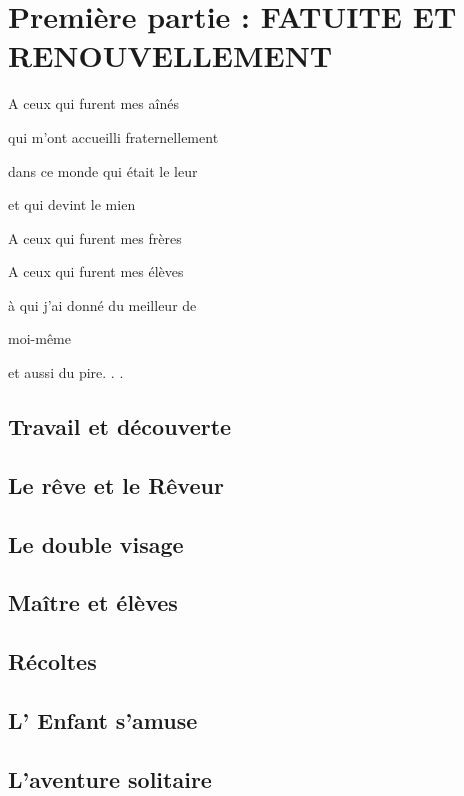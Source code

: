 \part{Première partie : FATUITE ET RENOUVELLEMENT}

\newpage

\begin{center}
    A ceux qui furent mes aînés
    
    qui m’ont accueilli fraternellement  
    
    dans ce monde qui était le leur  
    
    et qui devint le mien

    \vspace{1cm}

    A ceux qui furent mes frères
    
    A ceux qui furent mes élèves  
    
    à qui j’ai donné du meilleur de  
    
    moi-même  
    
    et aussi du pire. . .
\end{center}

\newpage

\chapter{Travail et découverte}




\chapter{Le rêve et le Rêveur}











\chapter{Le double visage}









\chapter{Maître et élèves}








\chapter{Récoltes}









\chapter{L' Enfant s'amuse}




\chapter{L'aventure solitaire}





